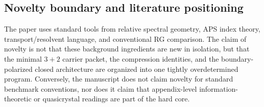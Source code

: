 \subsection{Novelty boundary and literature positioning}

The paper uses standard tools from relative spectral geometry, APS index theory, transport/resolvent language, and conventional RG comparison. The claim of novelty is not that these background ingredients are new in isolation, but that the minimal $3+2$ carrier packet, the compression identities, and the boundary-polarized closed architecture are organized into one tightly overdetermined program. Conversely, the manuscript does not claim novelty for standard benchmark conventions, nor does it claim that appendix-level information-theoretic or quasicrystal readings are part of the hard core.

